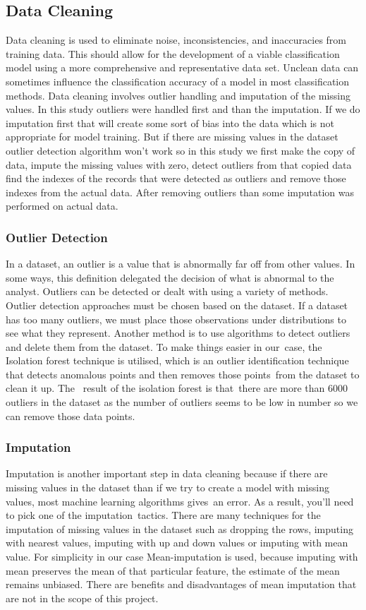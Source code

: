 \documentclass[12pt]{article}
\begin{document}
\subsection{Data Cleaning}
Data cleaning is used to eliminate noise, inconsistencies, and inaccuracies from training data. This should allow for the development of a viable classification model using a more comprehensive and representative data set. Unclean data can sometimes influence the classification accuracy of a model in most classification methods. Data cleaning involves outlier handling and imputation of the missing values. In this study outliers were handled first and than the imputation. If we do imputation first that will create some sort of bias into the data which is not appropriate for model training. But if there are missing values in the dataset outlier detection algorithm won't work so in this study we first make the copy of data, impute the missing values with zero, detect outliers from that copied data find the indexes of the records that were detected as outliers and remove those indexes from the actual data. After removing outliers than some imputation was performed on actual data.
\subsubsection{Outlier Detection}

In a dataset, an outlier is a value that is abnormally far off from other values. In some ways, this definition delegated the decision of what is abnormal to the analyst. Outliers can be detected or dealt with using a variety of methods. Outlier detection approaches must be chosen based on the dataset. If a dataset has too many outliers, we must place those observations under distributions to see what they represent. Another method is to use algorithms to detect outliers and delete them from the dataset. To make things easier in our case, the Isolation forest technique is utilised, which is an outlier identification technique that detects anomalous points and then removes those points from the dataset to clean it up. The  result of the isolation forest is that there are more than 6000 outliers in the dataset as the number of outliers seems to be low in number so we can remove those data points.

\subsubsection{Imputation}
Imputation is another important step in data cleaning because if there are missing values in the dataset than if we try to create a model with missing values, most machine learning algorithms gives an error. As a result, you'll need to pick one of the imputation tactics. There are many techniques for the imputation of missing values in the dataset such as dropping the rows, imputing with nearest values, imputing with up and down values or imputing with mean value. For simplicity in our case Mean-imputation is used, because imputing with mean preserves the mean of that particular feature, the estimate of the mean remains unbiased. There are benefits and disadvantages of mean imputation that are not in the scope of this project.
\end{document}
